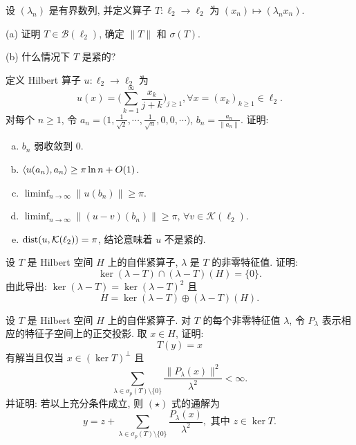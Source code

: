 \begin{exercise}
    设 $(\lambda_n)$ 是有界数列, 并定义算子 $T:\ell_2\to\ell_2$ 为 $(x_n)\mapsto (\lambda_n x_n)$.

    (a) 证明 $T\in\mathcal{B}(\ell_2)$, 确定 $\|T\|$ 和 $\sigma(T)$.

    (b) 什么情况下 $T$ 是紧的?
\end{exercise}



\begin{exercise}
    定义 Hilbert 算子 $u:\ell_2\to\ell_2$ 为
    \[u(x)=\biggl(\sum_{k=1}^{\infty}\frac{x_k}{j+k}\biggr)_{j\geq 1},\forall x=(x_k)_{k\geq 1}\in\ell_2.\]
    对每个 $n\geq 1$, 令 $a_n=\bigl(1,\frac{1}{\sqrt{2}},\cdots,\frac{1}{\sqrt{n}},0,0,\cdots\bigr)$, $b_n=\frac{a_n}{\|a_n\|}$.
    证明:
    \begin{enumerate}[(a)]
        \item $b_n$ 弱收敛到 $0$.
        \item $\langle u(a_n),a_n\rangle\geq\pi\ln n+O(1)$.
        \item $\liminf_{n\to\infty}\|u(b_n)\|\geq\pi$.
        \item $\liminf_{n\to\infty}\|(u-v)(b_n)\|\geq\pi$, $\forall v\in\mathcal{K}(\ell_2)$.
        \item $\operatorname{dist}(u,\mathcal{K}(\ell_2))=\pi$, 结论意味着 $u$ 不是紧的.
    \end{enumerate}
\end{exercise}



\begin{exercise}
    设 $T$ 是 Hilbert 空间 $H$ 上的自伴紧算子, $\lambda$ 是 $T$ 的非零特征值. 证明:
    \[\ker(\lambda-T)\cap (\lambda-T)(H)=\{0\}.\]
    由此导出: $\ker(\lambda-T)=\ker(\lambda-T)^2$ 且
    \[H=\ker(\lambda-T)\oplus(\lambda-T)(H).\]
\end{exercise}



\begin{exercise}
    设 $T$ 是 Hilbert 空间 $H$ 上的自伴紧算子. 对 $T$ 的每个非零特征值 $\lambda$,
    令 $P_{\lambda}$ 表示相应的特征子空间上的正交投影. 取 $x\in H$, 证明:
    \begin{equation}
        T(y)=x\tag{$\star$}
    \end{equation}
    有解当且仅当 $x\in(\ker T)^{\perp}$ 且
    \[\sum_{\lambda\in\sigma_p(T)\setminus\{0\}} \frac{\|P_{\lambda}(x)\|^2}{\lambda^2}<\infty.\]
    并证明: 若以上充分条件成立, 则 $(\star)$ 式的通解为
    \[y=z+\sum_{\lambda\in\sigma_p(T)\setminus\{0\}} \frac{P_{\lambda}(x)}{\lambda^2},\text{\ 其中\ }z\in\ker T.\]
\end{exercise}



